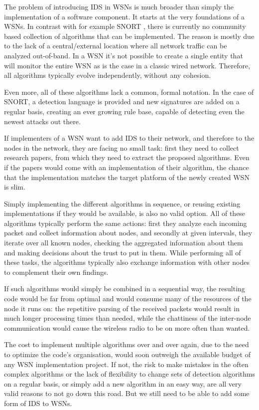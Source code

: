 \documentclass[conference]{IEEEtran}
\begin{document}
The problem of introducing IDS in WSNs is much broader than simply the
implementation of a software component. It starts at the very foundations of a
WSNs. In contrast with for example SNORT \cite{roesch1999snort}, there is
currently no community based collection of algorithms that can be implemented.
The reason is mostly due to the lack of a central/external location where all
network traffic can be analyzed out-of-band. In a WSN it's not possible to
create a single entity that will monitor the entire WSN as is the case in a
classic wired network. Therefore, all algorithms typically evolve
independently, without any cohesion.

Even more, all of these algorithms lack a common, formal notation. In the case
of SNORT, a detection language is provided and new signatures are added on a
regular basis, creating an ever growing rule base, capable of detecting even
the newest attacks out there.

If implementers of a WSN want to add IDS to their network, and therefore to the
nodes in the network, they are facing no small task: first they need to collect
research papers, from which they need to extract the proposed algorithms. Even
if the papers would come with an implementation of their algorithm, the chance
that the implementation matches the target platform of the newly created WSN is
slim.

Simply implementing the different algorithms in sequence, or reusing existing
implementations if they would be available, is also no valid option. All of
these algorithms typically perform the same actions: first they analyze each
incoming packet and collect information about nodes, and secondly at given
intervals, they iterate over all known nodes, checking the aggregated
information about them and making decisions about the trust to put in them.
While performing all of these tasks, the algorithms typically also exchange
information with other nodes to complement their own findings.

If such algorithms would simply be combined in a sequential way, the resulting
code would be far from optimal and would consume many of the resources of the
node it runs on: the repetitive parsing of the received packets would result in
much longer processing times than needed, while the chattiness of the
inter-node communication would cause the wireless radio to be on more often
than wanted.

The cost to implement multiple algorithms over and over again, due to the need
to optimize the code's organisation, would soon outweigh the available budget
of any WSN implementation project. If not, the risk to make mistakes in the
often complex algorithms or the lack of flexibility to change sets of detection
algorithms on a regular basis, or simply add a new algorithm in an easy way,
are all very valid reasons to not go down this road. But we still need to be
able to add some form of IDS to WSNs.
\end{document}
